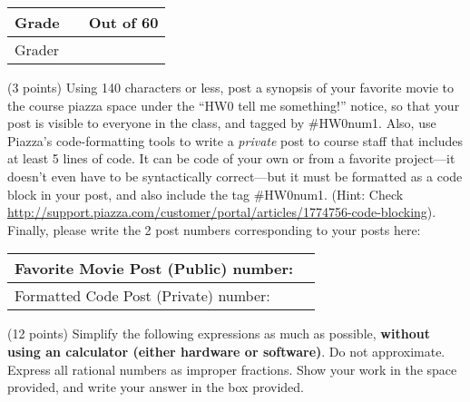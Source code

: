 \documentclass[11pt]{article}
\begin{document}
\vfil
\begin{table}[h]
    \centering
    \begin{tabular}{|l|l|c|} \hline
        Grade & \hspace{.75in} & Out of 60 \\ \hline
        Grader & \multicolumn{2}{c|}{} \\ \hline
    \end{tabular}
\end{table}

\newpage
\begin{problems}
\item (3 points)
    Using 140 characters or less, post a synopsis of your favorite movie to the
    course piazza space under the ``HW0 tell me something!'' notice, so that
    your post is visible to everyone in the class, and tagged by \#HW0num1.
    Also, use Piazza's code-formatting tools to write a {\em private} post to
    course staff that includes at least 5 lines of code. It can be code of your
    own or from a favorite project---it doesn't even have to be syntactically
    correct---but it must be formatted as a code block in your post, and also
    include the tag \#HW0num1. (Hint: Check
    \url{http://support.piazza.com/customer/portal/articles/1774756-code-blocking}).
    Finally, please write the 2 post numbers corresponding to your posts here:

    \begin{table}[h]
        \begin{center}
            \begin{tabular}{|l|c|}
                \hline
                Favorite Movie Post (Public) number: & \hspace{2in} \\ \hline
                Formatted Code Post (Private) number: & \hspace{2in} \\ \hline
            \end{tabular}
        \end{center}
    \end{table}

\item (12 points)
    Simplify the following expressions as much as possible, \textbf{without
    using an calculator (either hardware or software)}. Do not approximate.
    Express all rational numbers as improper fractions. Show your work in the
    space provided, and write your answer in the box provided.


\end{problems}
\end{document}
